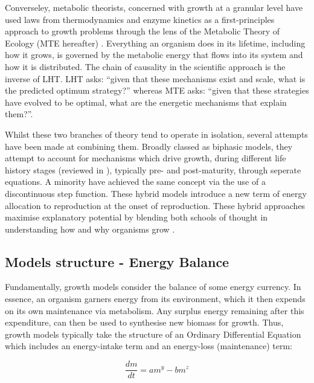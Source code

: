 \documentclass[a4paper]{article} %
\begin{document}
        Converseley, metabolic theorists, concerned with growth at a granular level have used laws from thermodynamics and enzyme kinetics as a first-principles approach to growth problems through the lens of the Metabolic Theory of Ecology (MTE hereafter) \autocite{Brown2004}. Everything an organism does in its lifetime, including how it grows, is governed by the metabolic energy that flows into its system and how it is distributed. The chain of causality in the scientific approach is the inverse of LHT. LHT asks: ``given that these mechanisms exist and scale, what is the predicted optimum strategy?'' whereas MTE asks: ``given that these strategies have evolved to be optimal, what are the energetic mechanisms that explain them?''.
        
        Whilst these two branches of theory tend to operate in isolation, several attempts have been made at combining them. Broadly classed as biphasic models, they attempt to account for mechanisms which drive growth, during different life history stages (reviewed in \autocite{Wilson2018}), typically pre- and post-maturity, through seperate equations. A minority have achieved the same concept via the use of a discontinuous step function. These hybrid models introduce a new term of energy allocation to reproduction at the onset of reproduction. These hybrid approaches maximise explanatory potential by blending both schools of thought in understanding how and why organisms grow \autocite{Marshall2019b}.

        \subsection{Models structure - Energy Balance}
        Fundamentally, growth models consider the balance of some energy currency. In essence, an organism garners energy from its environment, which it then expends on its own maintenance via metabolism. Any surplus energy remaining after this expenditure, can then be used to synthesise new biomass for growth.  Thus, growth models typically take the structure of an Ordinary Differential Equation which includes an energy-intake term and an energy-loss (maintenance) term:

        \begin{equation}
            \frac{dm}{dt} = am^y - bm^z \label{difference_equation}
        \end{equation}
        
\end{document}
